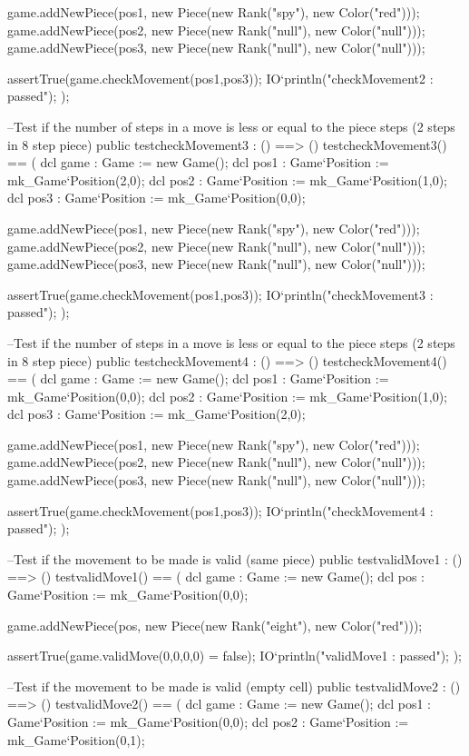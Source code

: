 \begin{vdm_al}
    game.addNewPiece(pos1, new Piece(new Rank("spy"), new Color("red")));
    game.addNewPiece(pos2, new Piece(new Rank("null"), new Color("null")));
    game.addNewPiece(pos3, new Piece(new Rank("null"), new Color("null")));
    
    assertTrue(game.checkMovement(pos1,pos3));
    IO`println("checkMovement2 : passed");
   );
   
  --Test if the number of steps in a move is less or equal to the piece steps (2 steps in 8 step piece)
  public testcheckMovement3 : () ==> ()
   testcheckMovement3() ==
   (
    dcl game : Game := new Game();
    dcl pos1 : Game`Position := mk_Game`Position(2,0);
    dcl pos2 : Game`Position := mk_Game`Position(1,0);
    dcl pos3 : Game`Position := mk_Game`Position(0,0);
    
    game.addNewPiece(pos1, new Piece(new Rank("spy"), new Color("red")));
    game.addNewPiece(pos2, new Piece(new Rank("null"), new Color("null")));
    game.addNewPiece(pos3, new Piece(new Rank("null"), new Color("null")));
    
    assertTrue(game.checkMovement(pos1,pos3));
    IO`println("checkMovement3 : passed");
   );
   
  --Test if the number of steps in a move is less or equal to the piece steps (2 steps in 8 step piece)
  public testcheckMovement4 : () ==> ()
   testcheckMovement4() ==
   (
    dcl game : Game := new Game();
    dcl pos1 : Game`Position := mk_Game`Position(0,0);
    dcl pos2 : Game`Position := mk_Game`Position(1,0);
    dcl pos3 : Game`Position := mk_Game`Position(2,0);
    
    game.addNewPiece(pos1, new Piece(new Rank("spy"), new Color("red")));
    game.addNewPiece(pos2, new Piece(new Rank("null"), new Color("null")));
    game.addNewPiece(pos3, new Piece(new Rank("null"), new Color("null")));
    
    assertTrue(game.checkMovement(pos1,pos3));
    IO`println("checkMovement4 : passed");
   );
  
  --Test if the movement to be made is valid (same piece)
  public testvalidMove1 : () ==> ()
   testvalidMove1() ==
   (
    dcl game : Game := new Game();
    dcl pos : Game`Position := mk_Game`Position(0,0);
    
    game.addNewPiece(pos, new Piece(new Rank("eight"), new Color("red")));
    
    assertTrue(game.validMove(0,0,0,0) = false);
    IO`println("validMove1 : passed");
   );
  
  --Test if the movement to be made is valid (empty cell)
  public testvalidMove2 : () ==> ()
   testvalidMove2() ==
   (
    dcl game : Game := new Game();
    dcl pos1 : Game`Position := mk_Game`Position(0,0);
    dcl pos2 : Game`Position := mk_Game`Position(0,1);
    

\end{vdm_al}
